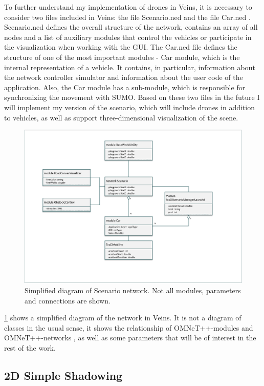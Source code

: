 \documentclass[]{nsm-thesis}
\begin{document}
To further understand my implementation of drones in Veins, it is necessary to consider two files included in Veins: the file Scenario.ned \cite{scenarioned} and the file Car.ned \cite{carned}. Scenario.ned defines the overall structure of the network, contains an array of all nodes and a list of auxiliary modules that control the vehicles or participate in the visualization when working with the GUI. The Car.ned file defines the structure of one of the most important modules - Car module, which is the internal representation of a vehicle. It contains, in particular, information about the network controller simulator and information about the user code of the application. Also, the Car module has a sub-module, which is responsible for synchronizing the movement with SUMO. Based on these two files in the future I will implement my version of the scenario, which will include drones in addition to vehicles, as well as support three-dimensional visualization of the scene. 

\begin{figure}
	\centering
	\includegraphics[width=1\textwidth]{figures/Scenario.pdf}
	\caption{Simplified diagram of Scenario \cite{scenarioned} network. Not all modules, parameters and connections are shown.}
	\label{fig:scenarioned}
\end{figure}

\cref{fig:scenarioned} shows a simplified diagram of the network in Veins. It is not a diagram of classes in the usual sense, it shows the relationship of OMNeT++-modules and OMNeT++-networks , as well as some parameters that will be of interest in the rest of the work. 

\subsection{2D Simple Shadowing}
\end{document}
